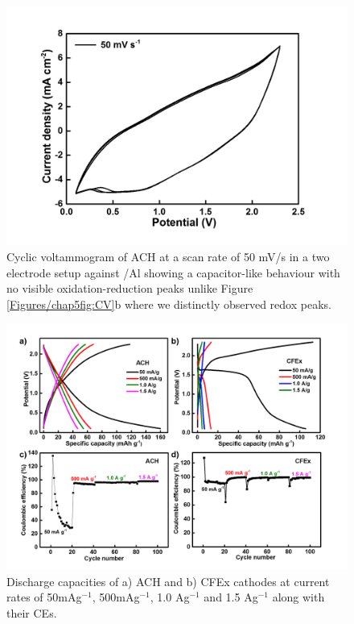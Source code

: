 \begin{figure}[h!]
\centering
\includegraphics[width=\textwidth]{Figures/chap5fig/hair50mVs}
\caption{Cyclic voltammogram of ACH at a scan rate of 50 mV/s in a two electrode setup against /Al showing a capacitor-like behaviour with no visible oxidation-reduction peaks unlike Figure \ref{Figures/chap5fig:CV}b where we distinctly observed redox peaks.}
\label{Figures/chap5fig:hair50mVs}
\end{figure}

\begin{figure}[h!]
  \centering
  \includegraphics[width=\textwidth]{Figures/chap5fig/cfexachlong}
    \caption{Discharge capacities of a) ACH and b) CFEx cathodes at current rates of 50mAg$^{-1}$, 500mAg$^{-1}$, 1.0 Ag$^{-1}$ and 1.5 Ag$^{-1}$ along with their CEs. }
  \label{Figures/chap5fig:cfexachlong}
\end{figure}

